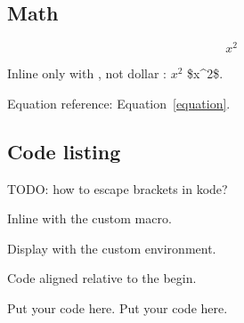   \subsection{Math}

  \begin{equation}
    \label{equation}
    x^2
  \end{equation}

  Inline only with \kode{\(  \)}, not dollar \kode{\$}: \( x^2 \) \$x\^{}2\$.

  Equation reference: Equation~\ref{equation}.

  \subsection{Code listing}

    TODO: how to escape brackets in kode?

    Inline with the custom  macro.

    Display with the custom  environment.

    Code aligned relative to the begin.

    \begin{code}
    Put your code here.
    Put your code here.
    \end{code}

